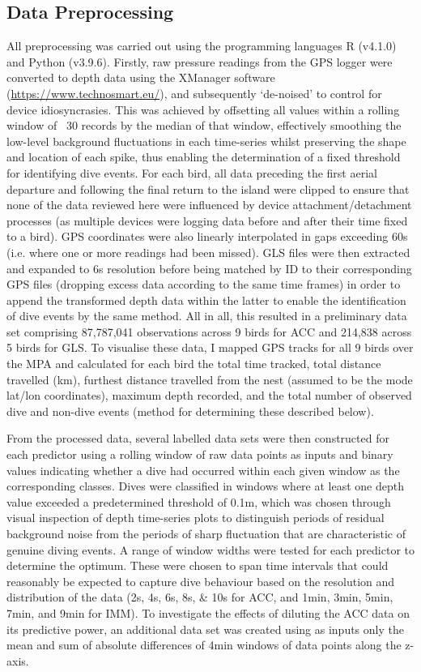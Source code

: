 \documentclass[11pt]{article}
\begin{document}
    \subsection{Data Preprocessing}
    All preprocessing was carried out using the programming languages R (v4.1.0) and Python (v3.9.6). Firstly, raw pressure readings from the GPS logger were converted to depth data using the XManager software (\url{https://www.technosmart.eu/}), and subsequently ‘de-noised’ to control for device idiosyncrasies. This was achieved by offsetting all values within a rolling window of ~30 records by the median of that window, effectively smoothing the low-level background fluctuations in each time-series whilst preserving the shape and location of each spike, thus enabling the determination of a fixed threshold for identifying dive events. For each bird, all data preceding the first aerial departure and following the final return to the island were clipped to ensure that none of the data reviewed here were influenced by device attachment/detachment processes (as multiple devices were logging data before and after their time fixed to a bird). GPS coordinates were also linearly interpolated in gaps exceeding 60s (i.e. where one or more readings had been missed). GLS files were then extracted and expanded to 6s resolution before being matched by ID to their corresponding GPS files (dropping excess data according to the same time frames) in order to append the transformed depth data within the latter to enable the identification of dive events by the same method. All in all, this resulted in a preliminary data set comprising 87,787,041 observations across 9 birds for ACC and 214,838 across 5 birds for GLS. To visualise these data, I mapped GPS tracks for all 9 birds over the MPA and calculated for each bird the total time tracked, total distance travelled (km), furthest distance travelled from the nest (assumed to be the mode lat/lon coordinates), maximum depth recorded, and the total number of observed dive and non-dive events (method for determining these described below).
    
    From the processed data, several labelled data sets were then constructed for each predictor using a rolling window of raw data points as inputs and binary values indicating whether a dive had occurred within each given window as the corresponding classes. Dives were classified in windows where at least one depth value exceeded a predetermined threshold of 0.1m, which was chosen through visual inspection of depth time-series plots to distinguish periods of residual background noise from the periods of sharp fluctuation that are characteristic of genuine diving events. A range of window widths were tested for each predictor to determine the optimum. These were chosen to span time intervals that could reasonably be expected to capture dive behaviour based on the resolution and distribution of the data (2s, 4s, 6s, 8s, \& 10s for ACC, and 1min, 3min, 5min, 7min, and 9min for IMM). To investigate the effects of diluting the ACC data on its predictive power, an additional data set was created using as inputs only the mean and sum of absolute differences of 4min windows of data points along the z-axis.  
    
\end{document}
